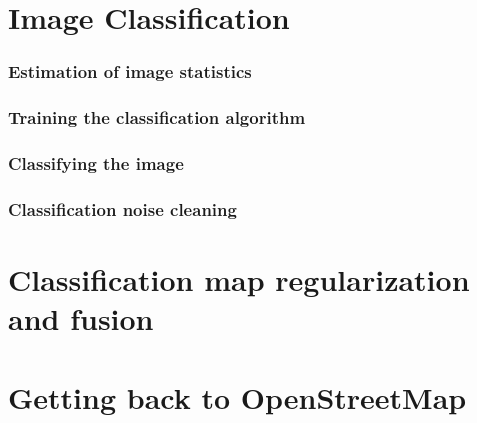 \documentclass[8pt]{beamer}
\begin{document}
\section{Image Classification}

\begin{frame}
\frametitle{Estimation of image statistics}

\end{frame}

\begin{frame}
\frametitle{Training the classification algorithm}

\end{frame}


\begin{frame}
\frametitle{Classifying the image}

\end{frame}

\begin{frame}
\frametitle{Classification noise cleaning}

\end{frame}



\section{Classification map regularization and fusion}

\section{Getting back to OpenStreetMap}
\end{document}

